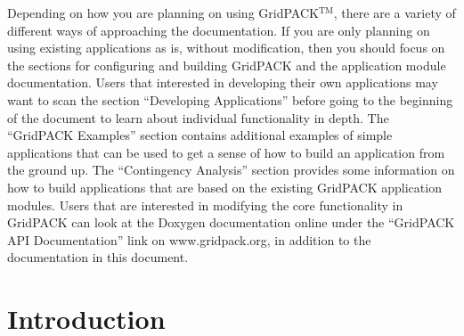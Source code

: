 \documentclass[12pt]{report} %
\begin{document}
Depending on how you are planning on using GridPACK$\mathrm{{}^{TM}}$, there are a variety of different ways of approaching the documentation. If you are only planning on using existing applications as is, without modification, then you should focus on the sections for configuring and building GridPACK and the application module documentation. Users that interested in developing their own applications may want to scan the section ``Developing Applications'' before going to the beginning of the document to learn about individual functionality in depth. The ``GridPACK Examples'' section contains additional examples of simple applications that can be used to get a sense of how to build an application from the ground up. The ``Contingency Analysis'' section provides some information on how to build applications that are based on the existing GridPACK application modules. Users that are interested in modifying the core functionality in GridPACK can look at the Doxygen documentation online under the ``GridPACK API Documentation'' link on www.gridpack.org, in addition to the documentation in this document.
\eject

\chapter{Introduction}
\end{document}
